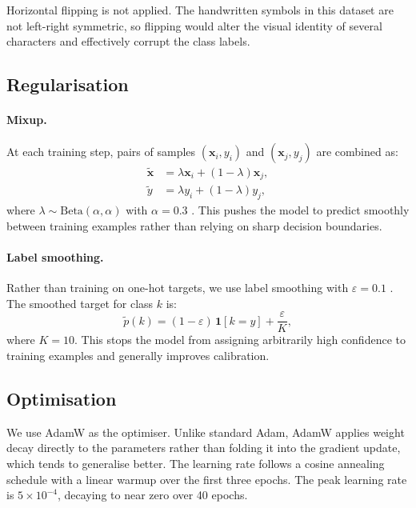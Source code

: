 \documentclass[a4paper,fleqn]{cas-sc}
\begin{document}
Horizontal flipping is not applied. The handwritten symbols in this dataset are not left-right symmetric, so flipping would alter the visual identity of several characters and effectively corrupt the class labels.

\subsection{Regularisation}

\paragraph{Mixup.} At each training step, pairs of samples $(\mathbf{x}_i, y_i)$ and $(\mathbf{x}_j, y_j)$ are combined as:
\begin{align}
    \tilde{\mathbf{x}} &= \lambda \mathbf{x}_i + (1-\lambda)\mathbf{x}_j, \\
    \tilde{y}          &= \lambda y_i + (1-\lambda) y_j,
\end{align}
where $\lambda \sim \mathrm{Beta}(\alpha, \alpha)$ with $\alpha = 0.3$ \citep{zhang2018mixup}. This pushes the model to predict smoothly between training examples rather than relying on sharp decision boundaries.

\paragraph{Label smoothing.} Rather than training on one-hot targets, we use label smoothing with $\varepsilon = 0.1$ \citep{muller2019label}. The smoothed target for class $k$ is:
\begin{equation}
    \tilde{p}(k) = (1 - \varepsilon)\,\mathbf{1}[k = y] + \frac{\varepsilon}{K},
\end{equation}
where $K = 10$. This stops the model from assigning arbitrarily high confidence to training examples and generally improves calibration.

\subsection{Optimisation}

We use AdamW \citep{loshchilov2019adamw} as the optimiser. Unlike standard Adam, AdamW applies weight decay directly to the parameters rather than folding it into the gradient update, which tends to generalise better. The learning rate follows a cosine annealing schedule \citep{loshchilov2017cosine} with a linear warmup over the first three epochs. The peak learning rate is $5 \times 10^{-4}$, decaying to near zero over 40 epochs.
\end{document}
